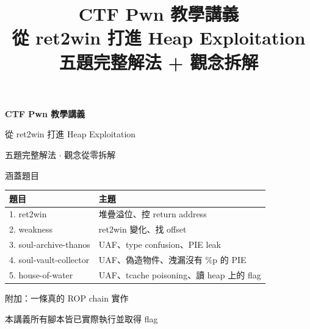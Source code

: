 \documentclass[11pt,a4paper,fontset=none]{ctexart}
\title{\bfseries CTF Pwn 教學講義\\[4pt]
       \large 從 ret2win 打進 Heap Exploitation\\[10pt]
       \normalsize\normalfont 五題完整解法 + 觀念拆解}
\author{}
\date{}
\begin{document}
\begin{titlepage}
\centering
\vspace*{3.2cm}
{\Huge\bfseries\sffamily CTF Pwn 教學講義\par}
\vspace{10pt}
{\LARGE\sffamily 從 ret2win 打進 Heap Exploitation\par}
\vspace{6pt}
{\large\sffamily 五題完整解法 $\cdot$ 觀念從零拆解\par}
\vspace{28pt}
{\large\sffamily 涵蓋題目\par}
\vspace{8pt}
{\large
\begin{tabular}{ll}
\toprule
\textbf{題目} & \textbf{主題}\\
\midrule
1. ret2win          & 堆疊溢位、控 return address\\
2. weakness         & ret2win 變化、找 offset\\
3. soul-archive-thanos & UAF、type confusion、PIE leak\\
4. soul-vault-collector & UAF、偽造物件、洩漏沒有 \%p 的 PIE\\
5. house-of-water   & UAF、tcache poisoning、讀 heap 上的 flag\\
\bottomrule
\end{tabular}\par}
\vspace{34pt}
{\large\sffamily 附加：一條真的 ROP chain 實作\par}
\vfill
{\small\sffamily 本講義所有腳本皆已實際執行並取得 flag\par}
\end{titlepage}

\tableofcontents
\newpage
{}











\end{document}
